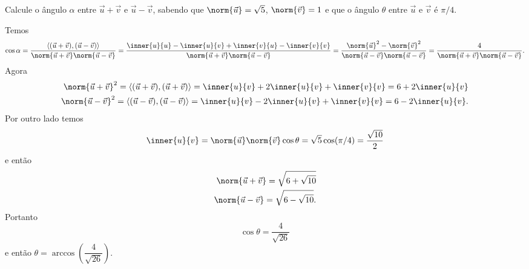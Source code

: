 \begin{exemplos}
  Calcule o ângulo $\alpha$ entre $\vec{u} + \vec{v}$ e $\vec{u} - \vec{v}$, sabendo que $\norm{\vec{u}} = \sqrt{5}$, $\norm{\vec{v}} = 1$ e que o ângulo $\theta$ entre $\vec{u}$ e $\vec{v}$ é $\pi/4$.
  \begin{solucao}
    Temos
    \begin{align*}
      \cos\alpha = \dfrac{\langle(\vec{u} + \vec{v}), (\vec{u} - \vec{v})\rangle}{\norm{\vec{u} + \vec{v}}\norm{\vec{u} - \vec{v}}} = \dfrac{\inner{u}{u} - \inner{u}{v} + \inner{v}{u} - \inner{v}{v}}{\norm{\vec{u} + \vec{v}}\norm{\vec{u} - \vec{v}}} = \dfrac{\norm{\vec{u}}^2 - \norm{\vec{v}}^2}{\norm{\vec{u} - \vec{v}}\norm{\vec{u} - \vec{v}}} = \dfrac{4}{\norm{\vec{u} + \vec{v}}\norm{\vec{u} - \vec{v}}}.
    \end{align*}
    Agora
    \begin{align*}
      \norm{\vec{u} + \vec{v}}^2 = \langle(\vec{u} + \vec{v}), (\vec{u} + \vec{v})\rangle = \inner{u}{v} + 2\inner{u}{v} + \inner{v}{v} = 6 + 2\inner{u}{v}\\
      \norm{\vec{u} - \vec{v}}^2 = \langle(\vec{u} - \vec{v}), (\vec{u} - \vec{v})\rangle = \inner{u}{v} - 2\inner{u}{v} + \inner{v}{v} = 6 - 2\inner{u}{v}.
    \end{align*}
    Por outro lado temos
    \begin{align*}
      \inner{u}{v} = \norm{\vec{u}}\norm{\vec{v}}\cos\theta = \sqrt{5}\cos(\pi/4) = \dfrac{\sqrt{10}}{2}
    \end{align*}
    e então
    \begin{align*}
      \norm{\vec{u} + \vec{v}} = \sqrt{6 + \sqrt{10}}\\
      \norm{\vec{u} - \vec{v}} = \sqrt{6 - \sqrt{10}}.
    \end{align*}
    Portanto
    \[
      \cos\theta = \dfrac{4}{\sqrt{26}}
    \]
    e então $\theta = \arccos\left(\dfrac{4}{\sqrt{26}}\right)$.
  \end{solucao}
\end{exemplos}


